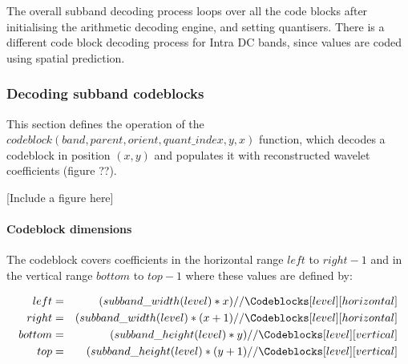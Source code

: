 The overall subband decoding process loops over all the code blocks after initialising the
arithmetic decoding engine, and setting quantisers. There is a different code block decoding
process for Intra DC bands, since values are coded using spatial prediction.

\begin{pseudo*}
  \bsELSE
  \bsEND
    \bsEND
  \bsEND

  \bsEND

\bsEND

\end{pseudo*}


\subsubsection{Decoding subband codeblocks}

\label{codeblocks}

This section defines the operation of the 
$codeblock(band,parent,orient,quant\_index,y,x)$ function, which decodes a 
codeblock in position $(x,y)$ and populates it with reconstructed 
wavelet coefficients (figure ??).

[Include a figure here]

\paragraph{Codeblock dimensions\newline}

The codeblock covers coefficients in the horizontal range $left$ to $right-1$ and in the vertical
range $bottom$ to $top-1$ where these values are defined by:

\begin{eqnarray*}
  left & = & (subband\_width(level)*x)//\Codeblocks[level][horizontal] \\
  right & = & (subband\_width(level)*(x+1)//\Codeblocks[level][horizontal] \\
  bottom & = & (subband\_height(level)*y)//\Codeblocks[level][vertical] \\
  top & = & (subband\_height(level)*(y+1)//\Codeblocks[level][vertical]
\end{eqnarray*}

